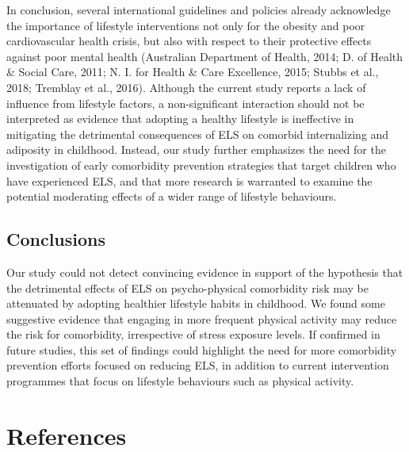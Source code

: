 \documentclass[
  letterpaper,
  DIV=11,
  numbers=noendperiod]{scrreport}
\begin{document}
In conclusion, several international guidelines and policies already
acknowledge the importance of lifestyle interventions not only for the
obesity and poor cardiovascular health crisis, but also with respect to
their protective effects against poor mental health (Australian
Department of Health, 2014; D. of Health \& Social Care, 2011; N. I. for
Health \& Care Excellence, 2015; Stubbs et al., 2018; Tremblay et al.,
2016). Although the current study reports a lack of influence from
lifestyle factors, a non-significant interaction should not be
interpreted as evidence that adopting a healthy lifestyle is ineffective
in mitigating the detrimental consequences of ELS on comorbid
internalizing and adiposity in childhood. Instead, our study further
emphasizes the need for the investigation of early comorbidity
prevention strategies that target children who have experienced ELS, and
that more research is warranted to examine the potential moderating
effects of a wider range of lifestyle behaviours. 

\subsection{Conclusions}\label{conclusions}

Our study could not detect convincing evidence in support of the
hypothesis that the detrimental effects of ELS on psycho-physical
comorbidity risk may be attenuated by adopting healthier lifestyle
habits in childhood. We found some suggestive evidence that engaging in
more frequent physical activity may reduce the risk for comorbidity,
irrespective of stress exposure levels. If confirmed in future studies,
this set of findings could highlight the need for more comorbidity
prevention efforts focused on reducing ELS, in addition to current
intervention programmes that focus on lifestyle behaviours such as
physical activity.

\section*{References}\label{references-2}

\end{document}
